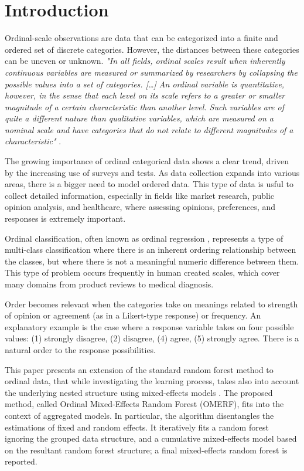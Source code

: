 \section{Introduction}
\label{sec:introduction}
Ordinal-scale observations are data that can be categorized into a finite and ordered set of discrete categories. However, the distances between these categories can be uneven or unknown.
\textit{"In all fields, ordinal scales result when inherently continuous variables are measured or summarized by researchers by collapsing the possible values into a set of categories. [\dots]
An ordinal variable is quantitative, however, in the sense that each level on its scale refers to a greater or smaller magnitude of a certain characteristic than another level.
Such variables are of quite a different nature than qualitative variables, which are measured on a nominal scale and have categories that do not relate to different magnitudes of a characteristic"} \cite{agresti2010analysis}.

The growing importance of ordinal categorical data shows a clear trend, driven by the increasing use of surveys and tests.
As data collection expands into various areas, there is a bigger need to model ordered data.
This type of data is usful to collect detailed information, especially in fields like market research, public opinion analysis, and healthcare, where assessing opinions, preferences, and responses is extremely important.

Ordinal classification, often known as ordinal regression \cite{mccullagh1980regression}, represents a type of multi-class classification where there is an inherent ordering relationship between the classes, but where there is not a meaningful numeric difference between them.
This type of problem occurs frequently in human created scales, which cover many domains from product reviews to medical diagnosis.

Order becomes relevant when the categories take on meanings related to strength of opinion or agreement (as in a Likert-type response) or frequency.
An explanatory example is the case where a response variable takes on four possible values: (1) strongly disagree, (2) disagree, (4) agree, (5) strongly agree. There is a natural order to the response possibilities.

This paper presents an extension of the standard random forest method \cite{breiman2001random} to ordinal data, that while investigating the learning process, takes also into account the underlying nested structure using mixed-effects models \cite{pinheiro2006mixed}.
The proposed method, called Ordinal Mixed-Effects Random Forest (OMERF), fits into the context of aggregated models.
In particular, the algorithm disentangles the estimations of fixed and random effects. It iteratively fits a random forest ignoring the grouped data structure, and a cumulative mixed-effects model based on the resultant random forest structure; a final mixed-effects random forest is reported.

